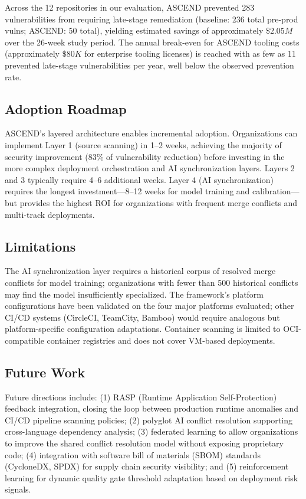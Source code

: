 \documentclass[journal]{IEEEtran}
\begin{document}
Across the 12 repositories in our evaluation, ASCEND prevented 283 vulnerabilities from requiring late-stage remediation (baseline: 236 total pre-prod vulns; ASCEND: 50 total), yielding estimated savings of approximately $\$2.05M$ over the 26-week study period. The annual break-even for ASCEND tooling costs (approximately $\$80K$ for enterprise tooling licenses) is reached with as few as 11 prevented late-stage vulnerabilities per year, well below the observed prevention rate.

\subsection{Adoption Roadmap}

ASCEND's layered architecture enables incremental adoption. Organizations can implement Layer 1 (source scanning) in 1--2 weeks, achieving the majority of security improvement (83\% of vulnerability reduction) before investing in the more complex deployment orchestration and AI synchronization layers. Layers 2 and 3 typically require 4--6 additional weeks. Layer 4 (AI synchronization) requires the longest investment---8--12 weeks for model training and calibration---but provides the highest ROI for organizations with frequent merge conflicts and multi-track deployments.

\subsection{Limitations}

The AI synchronization layer requires a historical corpus of resolved merge conflicts for model training; organizations with fewer than 500 historical conflicts may find the model insufficiently specialized. The framework's platform configurations have been validated on the four major platforms evaluated; other CI/CD systems (CircleCI, TeamCity, Bamboo) would require analogous but platform-specific configuration adaptations. Container scanning is limited to OCI-compatible container registries and does not cover VM-based deployments.

\subsection{Future Work}

Future directions include: (1) RASP (Runtime Application Self-Protection) feedback integration, closing the loop between production runtime anomalies and CI/CD pipeline scanning policies; (2) polyglot AI conflict resolution supporting cross-language dependency analysis; (3) federated learning to allow organizations to improve the shared conflict resolution model without exposing proprietary code; (4) integration with software bill of materials (SBOM) standards (CycloneDX, SPDX) for supply chain security visibility; and (5) reinforcement learning for dynamic quality gate threshold adaptation based on deployment risk signals.
\end{document}
